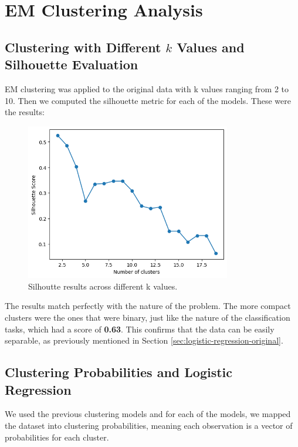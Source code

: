 \documentclass[a4paper,12pt]{article}
\begin{document}
\section{EM Clustering Analysis}
\label{sec:em-clustering}

\subsection{Clustering with Different \(k\) Values and Silhouette Evaluation}
EM clustering was applied to the original data with k values ranging from 2 to 10. Then we computed the silhouette metric for each of the models. These were the results:

\begin{figure}[H]
    \centering
    \includegraphics[width=0.8\textwidth]{imgs/silhouette.png}
    \caption{Silhoutte results across different k values.}
    \label{fig:silhouette}
\end{figure}


The results match perfectly with the nature of the problem. The more compact clusters were the ones that were binary, just like the nature of the classification tasks, which had a score of \textbf{0.63}. This confirms that the data can be easily separable, as previously mentioned in Section \ref{sec:logistic-regression-original}.

\subsection{Clustering Probabilities and Logistic Regression}
We used the previous clustering models and for each of the models, we mapped the dataset into clustering probabilities, meaning each observation is a vector of probabilities for each cluster.
\end{document}
